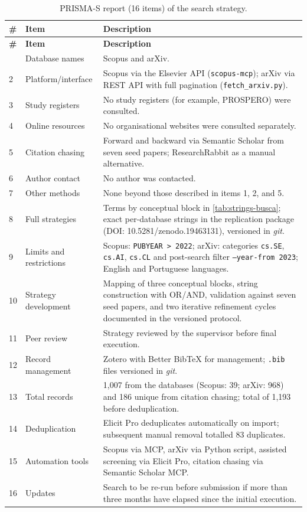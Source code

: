 \begin{longtable}{p{0.5cm}p{4cm}p{9cm}}
\caption{PRISMA-S report (16 items) of the search strategy.}
\label{tab:prisma-s} \\
\toprule
\textbf{\#} & \textbf{Item} & \textbf{Description} \\
\midrule
\endfirsthead
\toprule
\textbf{\#} & \textbf{Item} & \textbf{Description} \\
\midrule
\endhead
\bottomrule
\endfoot
1 & Database names & Scopus and arXiv. \\
2 & Platform/interface & Scopus via the Elsevier API (\texttt{scopus-mcp}); arXiv via REST API with full pagination (\texttt{fetch\_arxiv.py}). \\
3 & Study registers & No study registers (for example, PROSPERO) were consulted. \\
4 & Online resources & No organisational websites were consulted separately. \\
5 & Citation chasing & Forward and backward via Semantic Scholar from seven seed papers; ResearchRabbit as a manual alternative. \\
6 & Author contact & No author was contacted. \\
7 & Other methods & None beyond those described in items 1, 2, and 5. \\
8 & Full strategies & Terms by conceptual block in \autoref{tab:strings-busca}; exact per-database strings in the replication package (DOI: 10.5281/zenodo.19463131), versioned in \textit{git}. \\
9 & Limits and restrictions & Scopus: \texttt{PUBYEAR > 2022}; arXiv: categories \texttt{cs.SE}, \texttt{cs.AI}, \texttt{cs.CL} and post-search filter \texttt{--year-from 2023}; English and Portuguese languages. \\
10 & Strategy development & Mapping of three conceptual blocks, string construction with OR/AND, validation against seven seed papers, and two iterative refinement cycles documented in the versioned protocol. \\
11 & Peer review & Strategy reviewed by the supervisor before final execution. \\
12 & Record management & Zotero with Better BibTeX for management; \texttt{.bib} files versioned in \textit{git}. \\
13 & Total records & 1,007 from the databases (Scopus: 39; arXiv: 968) and 186 unique from citation chasing; total of 1,193 before deduplication. \\
14 & Deduplication & Elicit Pro deduplicates automatically on import; subsequent manual removal totalled 83 duplicates. \\
15 & Automation tools & Scopus via MCP, arXiv via Python script, assisted screening via Elicit Pro, citation chasing via Semantic Scholar MCP. \\
16 & Updates & Search to be re-run before submission if more than three months have elapsed since the initial execution. \\
\end{longtable}
